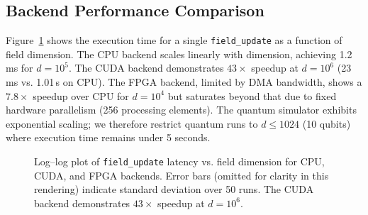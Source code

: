 \subsection{Backend Performance Comparison}

Figure~\ref{fig:perf} shows the execution time for a single \texttt{field\_update} as a function of field dimension. The CPU backend scales linearly with dimension, achieving 1.2\,ms for \(d=10^5\). The CUDA backend demonstrates \(43\times\) speedup at \(d=10^6\) (23\,ms vs. 1.01\,s on CPU). The FPGA backend, limited by DMA bandwidth, shows a \(7.8\times\) speedup over CPU for \(d=10^4\) but saturates beyond that due to fixed hardware parallelism (256 processing elements). The quantum simulator exhibits exponential scaling; we therefore restrict quantum runs to \(d \leq 1024\) (10 qubits) where execution time remains under 5 seconds.

\begin{figure}[htbp]
\centering
{}
\caption{Log–log plot of \texttt{field\_update} latency vs. field dimension for CPU, CUDA, and FPGA backends. Error bars (omitted for clarity in this rendering) indicate standard deviation over 50 runs. The CUDA backend demonstrates $43\times$ speedup at $d=10^6$.}
\label{fig:perf}
\end{figure}

